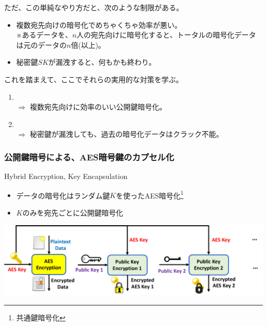 \documentclass[12pt,dvipdfmx]{beamer}
\begin{document}
\begin{frame}
ただ、この単純なやり方だと、次のような制限がある。

\begin{itemize}
 \item 複数宛先向けの暗号化で\alert{めちゃくちゃ効率が悪い}。\\
 ※あるデータを、$n$人の宛先向けに暗号化すると、トータルの暗号化データは元のデータの$n$倍(以上)。
 \item \alert{秘密鍵$\mathit{SK}$が漏洩すると、何もかも終わり}。
\end{itemize}
\end{frame}

\begin{frame}
これを踏まえて、ここでそれらの実用的な対策を学ぶ。
\begin{enumerate}
\item {}\\
$\Rightarrow$ 複数宛先向けに効率のいい公開鍵暗号化。
\item {}\\
$\Rightarrow$ 秘密鍵が漏洩しても、過去の暗号化データはクラック不能。
\end{enumerate}
\end{frame}

\begin{frame}
\frametitle{公開鍵暗号による、AES暗号鍵のカプセル化}
\begin{block}{\small Hybrid Encryption, Key Encapsulation}
\begin{itemize}
 \item データの暗号化はランダム鍵$K$を使ったAES暗号化\footnote[frame]{\scriptsize 共通鍵暗号化}
 \item $K$のみを宛先ごとに公開鍵暗号化
\end{itemize}
\end{block}

\vspace{2ex}

\begin{center}
\includegraphics[width=\linewidth]{Figs/hybrid-encryption-flow01.pdf}
\end{center}
\end{frame}
\end{document}
